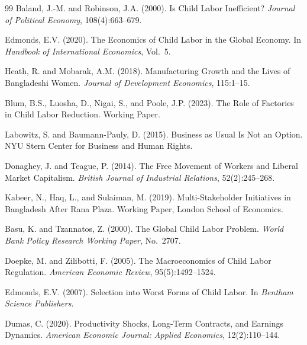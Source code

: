 \documentclass[12pt]{article}
\begin{document}
\begin{thebibliography}{99}
Baland, J.-M. and Robinson, J.A. (2000).
\newblock Is Child Labor Inefficient?
\newblock \textit{Journal of Political Economy}, 108(4):663--679.

Edmonds, E.V. (2020).
\newblock The Economics of Child Labor in the Global Economy.
\newblock In \textit{Handbook of International Economics}, Vol.~5.

Heath, R. and Mobarak, A.M. (2018).
\newblock Manufacturing Growth and the Lives of Bangladeshi Women.
\newblock \textit{Journal of Development Economics}, 115:1--15.

Blum, B.S., Luosha, D., Nigai, S., and Poole, J.P. (2023).
\newblock The Role of Factories in Child Labor Reduction.
\newblock Working Paper.

Labowitz, S. and Baumann-Pauly, D. (2015).
\newblock Business as Usual Is Not an Option.
\newblock NYU Stern Center for Business and Human Rights.

Donaghey, J. and Teague, P. (2014).
\newblock The Free Movement of Workers and Liberal Market Capitalism.
\newblock \textit{British Journal of Industrial Relations}, 52(2):245--268.

Kabeer, N., Haq, L., and Sulaiman, M. (2019).
\newblock Multi-Stakeholder Initiatives in Bangladesh After Rana Plaza.
\newblock Working Paper, London School of Economics.

Basu, K. and Tzannatos, Z. (2000).
\newblock The Global Child Labor Problem.
\newblock \textit{World Bank Policy Research Working Paper}, No.~2707.

Doepke, M. and Zilibotti, F. (2005).
\newblock The Macroeconomics of Child Labor Regulation.
\newblock \textit{American Economic Review}, 95(5):1492--1524.

Edmonds, E.V. (2007).
\newblock Selection into Worst Forms of Child Labor.
\newblock In \textit{Bentham Science Publishers}.

Dumas, C. (2020).
\newblock Productivity Shocks, Long-Term Contracts, and Earnings Dynamics.
\newblock \textit{American Economic Journal: Applied Economics}, 12(2):110--144.


\end{thebibliography}
\end{document}
